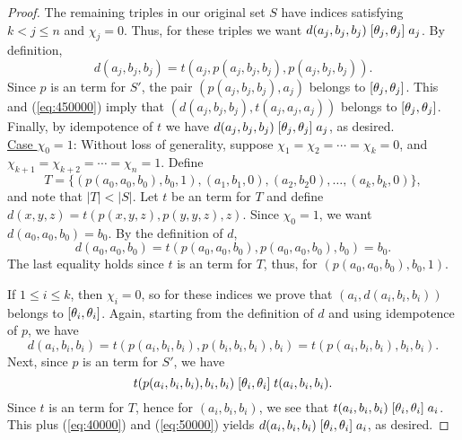 \begin{proof}
The remaining triples in our original set $S$
have indices satisfying $k<j\leq n$ and $\chi_j = 0$.
Thus, for these triples we want
$d(a_j,b_j,b_j)\mathrel{[\theta_j, \theta_j]} a_j$.
By definition,
\begin{equation}
  \label{eq:450000}
d(a_j,b_j,b_j) =t(a_j, p(a_j,b_j,b_j), p(a_j,b_j,b_j)).
\end{equation}
Since $p$ is an \ld term for $S'$, %
the pair $(p(a_j,b_j,b_j), a_j)$ belongs to $[\theta_j, \theta_j]$.
This and
(\ref{eq:450000}) imply
that
$(d(a_j, b_j,b_j), t(a_j,a_j,a_j))$
belongs to
$[\theta_j, \theta_j]$.
Finally, by idempotence of $t$ we have
$d(a_j,b_j,b_j)\mathrel{[\theta_j, \theta_j]} a_j$,
as desired.
\\[4pt]
\underline{Case $\chi_0 = 1$}:
Without loss of generality, suppose $\chi_1 = \chi_2 =\cdots =\chi_k = 0$,
and $\chi_{k+1} = \chi_{k+2} = \cdots = \chi_{n} = 1$. Define
\[
T = \{(p(a_0, a_0, b_0), b_0, 1),
(a_1, b_1, 0), (a_2, b_2 0), \dots, (a_k, b_k, 0)\},
\]
and note that $|T| < |S|$.
Let $t$ be an \ld term for $T$ and
define
$d(x,y,z) = t(p(x,y,z), p(y,y,z), z)$.
Since $\chi_0 =1$, we want $d(a_0,a_0,b_0) = b_0$. By the definition of
$d$,
\begin{equation*}
  d(a_0,a_0,b_0) =
  t(p(a_0,a_0,b_0), p(a_0,a_0,b_0), b_0) =b_0.
\end{equation*}
The last equality holds since $t$ is an \ld term for $T$, thus,
for $(p(a_0, a_0, b_0), b_0, 1)$.

If $1\leq i \leq k$, then $\chi_i =0$, so for these indices we prove
that $(a_i, d(a_i,b_i,b_i))$ belongs to $[\theta_i, \theta_i]$.
Again, starting from the definition of $d$ and using idempotence of $p$, we have
\begin{equation}
  \label{eq:40000}
  d(a_i,b_i,b_i) =
  t(p(a_i,b_i,b_i), p(b_i,b_i,b_i), b_i)=
  t(p(a_i,b_i,b_i), b_i, b_i).
\end{equation}
Next, since $p$ is an \ld term for $S'$, we have
\begin{equation}
  \label{eq:50000}
  t(p(a_i,b_i,b_i), b_i, b_i)
 \mathrel{[\theta_i, \theta_i]}
 t(a_i, b_i, b_i).
\end{equation}
Since $t$ is an \ld term for $T$, hence for
$(a_i, b_i, b_i)$,  %
we see that
$t(a_i, b_i, b_i) \mathrel{[\theta_i, \theta_i]} a_i$.
This plus (\ref{eq:40000}) and (\ref{eq:50000}) yields
$d(a_i,b_i,b_i) \mathrel{[\theta_i, \theta_i]} a_i$,
as desired.


\end{proof}

